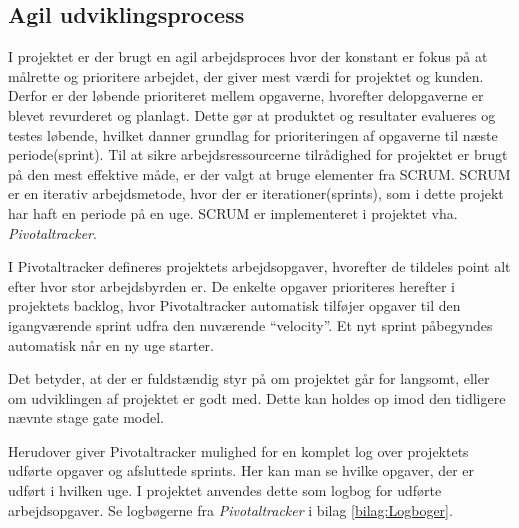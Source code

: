 



\subsection{Agil udviklingsprocess}
\label{subsec:agil}
I projektet er der brugt en agil arbejdsproces hvor der konstant er fokus på at målrette og prioritere arbejdet, der giver mest værdi for projektet og kunden. Derfor er der løbende prioriteret mellem opgaverne, hvorefter delopgaverne er blevet revurderet og planlagt. Dette gør at produktet og resultater evalueres og testes løbende, hvilket danner grundlag for prioriteringen af opgaverne til næste periode(sprint). Til at sikre arbejdsressourcerne tilrådighed for projektet er brugt på den mest effektive måde, er der valgt at bruge elementer fra SCRUM. SCRUM er en iterativ arbejdsmetode, hvor  der er iterationer(sprints), som i dette projekt har haft en periode på en uge. SCRUM er implementeret i projektet vha. \textit{Pivotaltracker}. 

I Pivotaltracker defineres projektets arbejdsopgaver, hvorefter de tildeles point alt efter hvor stor arbejdsbyrden er. De enkelte opgaver prioriteres herefter i projektets backlog, hvor Pivotaltracker automatisk tilføjer opgaver til den igangværende sprint udfra den nuværende “velocity”. Et nyt sprint påbegyndes automatisk når en ny uge starter.

Det betyder, at der er fuldstændig styr på om projektet går for langsomt, eller om udviklingen af projektet er godt med. Dette kan holdes op imod den tidligere nævnte stage gate model.

Herudover giver Pivotaltracker mulighed for en komplet log over projektets udførte opgaver og afsluttede sprints. Her kan man se hvilke opgaver, der er udført i hvilken uge. I projektet anvendes dette som logbog for udførte arbejdsopgaver. Se logbøgerne fra \textit{Pivotaltracker} i bilag \ref{bilag:Logboger}.

